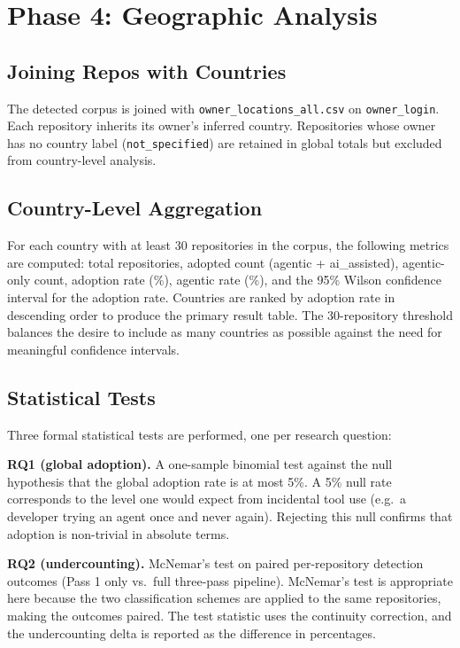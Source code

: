 \documentclass[12pt, a4paper]{article}
\begin{document}
\section{Phase 4: Geographic Analysis}

\subsection{Joining Repos with Countries}

The detected corpus is joined with \texttt{owner\_locations\_all.csv} on
\texttt{owner\_login}. Each repository inherits its owner's inferred country.
Repositories whose owner has no country label (\texttt{not\_specified}) are
retained in global totals but excluded from country-level analysis.

\subsection{Country-Level Aggregation}

For each country with at least 30 repositories in the corpus, the following
metrics are computed: total repositories, adopted count (agentic +
ai\_assisted), agentic-only count, adoption rate (\%), agentic rate (\%),
and the 95\% Wilson confidence interval for the adoption rate. Countries are
ranked by adoption rate in descending order to produce the primary result
table. The 30-repository threshold balances the desire to include as many
countries as possible against the need for meaningful confidence intervals.

\subsection{Statistical Tests}

Three formal statistical tests are performed, one per research question:

\textbf{RQ1 (global adoption).} A one-sample binomial test against the null
hypothesis that the global adoption rate is at most 5\%. A 5\% null rate
corresponds to the level one would expect from incidental tool use (e.g.\
a developer trying an agent once and never again). Rejecting this null
confirms that adoption is non-trivial in absolute terms.

\textbf{RQ2 (undercounting).} McNemar's test on paired per-repository
detection outcomes (Pass 1 only vs.\ full three-pass pipeline). McNemar's
test is appropriate here because the two classification schemes are applied
to the same repositories, making the outcomes paired. The test statistic uses
the continuity correction, and the undercounting delta is reported as the
difference in percentages.
\end{document}

